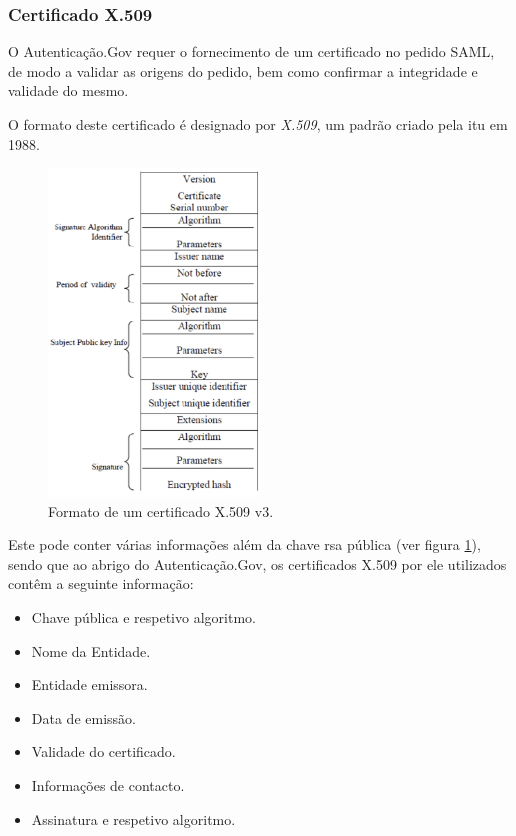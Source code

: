 \cleardoublepage
\subsubsection{Certificado X.509}

O Autenticação.Gov requer o fornecimento de um certificado no pedido SAML, de modo a validar as origens do pedido, bem como confirmar a integridade e validade do mesmo.

O formato deste certificado é designado por \emph{X.509}\cite{x509}, um padrão criado pela \gls{itu} em 1988.

\begin{figure}[h]
    \centering
    \includegraphics[width=0.5\textwidth]{img/x509/formato.png}
    \caption{Formato de um certificado X.509 v3.}
    \label{fig:x509formato}
\end{figure}

Este pode conter várias informações além da chave \gls{rsa} pública (ver figura \ref{fig:x509formato}), sendo que ao abrigo do Autenticação.Gov, os certificados X.509 por ele utilizados contêm a seguinte informação:

\begin{itemize}
    \item Chave pública e respetivo algoritmo.
    \item Nome da Entidade.
    \item Entidade emissora.
    \item Data de emissão.
    \item Validade do certificado.
    \item Informações de contacto.
    \item Assinatura e respetivo algoritmo.
\end{itemize}

